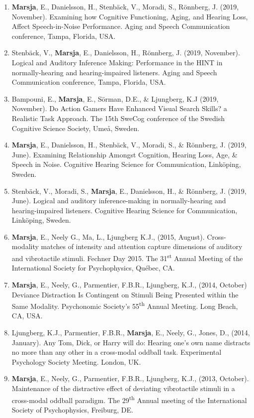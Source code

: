 \documentclass[]{article}
\begin{document}
\begin{enumerate}
\def\labelenumi{\arabic{enumi}.}
\item
  \textbf{Marsja}, E., Danielsson, H., Stenbäck, V., Moradi, S.,
  Rönnberg, J. (2019, November). Examining how Cognitive Functioning,
  Aging, and Hearing Loss, Affect Speech-in-Noise Performance. Aging and
  Speech Communication conference, Tampa, Florida, USA.
\item
  Stenbäck, V., \textbf{Marsja}, E., Danielsson, H., Rönnberg, J. (2019,
  November). Logical and Auditory Inference Making: Performance in the
  HINT in normally-hearing and hearing-impaired listeners. Aging and
  Speech Communication conference, Tampa, Florida, USA.
\item
  Bampouni, E., \textbf{Marsja}, E., Sörman, D.E., \& Ljungberg, K.J
  (2019, November). Do Action Gamers Have Enhanced Visual Search Skills?
  a Realistic Task Approach. The 15th SweCog conference of the Swedish
  Cognitive Science Society, Umeå, Sweden.
\item
  \textbf{Marsja}, E., Danielsson, H., Stenbäck, V., Moradi, S., \&
  Rönnberg, J. (2019, June). Examining Relationship Amongst Cognition,
  Hearing Loss, Age, \& Speech in Noise. Cognitive Hearing Science for
  Communication, Linköping, Sweden.
\item
  Stenbäck, V., Moradi, S., \textbf{Marsja}, E., Danielsson, H., \&
  Rönnberg, J. (2019, June). Logical and auditory inference-making in
  normally-hearing and hearing-impaired listeners. Cognitive Hearing
  Science for Communication, Linköping, Sweden.
\item
  \textbf{Marsja}, E., Neely G., Ma, L., Ljungberg K.J., (2015, August).
  Cross-modality matches of intensity and attention capture dimensions
  of auditory and vibrotactile stimuli. Fechner Day 2015. The
  31\textsuperscript{st} Annual Meeting of the International Society for
  Psychophysics, Québec, CA.
\item
  \textbf{Marsja}, E., Neely, G., Parmentier, F.B.R., Ljungberg, K.J.,
  (2014, October) Deviance Distraction Is Contingent on Stimuli Being
  Presented within the Same Modality. Psychonomic Society's
  55\textsuperscript{th} Annual Meeting. Long Beach, CA, USA.
\item
  Ljungberg, K.J., Parmentier, F.B.R., \textbf{Marsja}, E., Neely, G.,
  Jones, D., (2014, January). Any Tom, Dick, or Harry will do: Hearing
  one's own name distracts no more than any other in a cross-modal
  oddball task. Experimental Psychology Society Meeting. London, UK.
\item
  \textbf{Marsja}, E., Neely, G., Parmentier, F.B.R., Ljungberg, K.J.,
  (2013, October). Maintenance of the distractive effect of deviating
  vibrotactile stimuli in a cross-modal oddball paradigm. The
  29\textsuperscript{th} Annual meeting of the International Society of
  Psychophysics, Freiburg, DE.
\end{enumerate}
\end{document}
